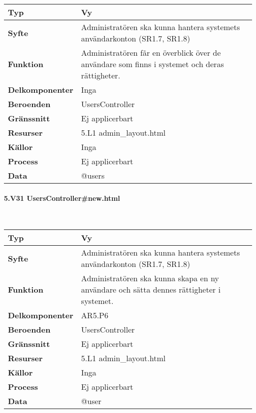 \documentclass[a4paper, twoside, 11pt, titlepage]{article}
\begin{document}
			\begin {table} [ht] \begin{tabular} {  p{3.5cm} p{11.6cm} }
				\hline
				{\sffamily\textbf{Typ}} & {Vy} \\
				\hline
				{\sffamily\textbf{Syfte}} & {Administratören ska kunna hantera systemets användarkonton (SR1.7, SR1.8)} \\
				\hline
				{\sffamily\textbf{Funktion}} & {Administratören får en överblick över de användare som finns i systemet och deras rättigheter.} \\
				\hline
				{\sffamily\textbf{Delkomponenter}} & {Inga} \\
				\hline
				{\sffamily\textbf{Beroenden}} & {UsersController} \\
				\hline
				{\sffamily\textbf{Gränssnitt}} & {Ej applicerbart} \\
				\hline
				{\sffamily\textbf{Resurser}} & {5.L1 admin\_layout.html} \\
				\hline
				{\sffamily\textbf{Källor}} & {Inga} \\
				\hline
				{\sffamily\textbf{Process}} & {Ej applicerbart} \\
				\hline
				{\sffamily\textbf{Data}} & {@users} \\
				\hline
			\end{tabular} \end{table} \FloatBarrier


			\paragraph{5.V31 UsersController\#new.html}\

			\begin {table} [ht] \begin{tabular} {  p{3.5cm} p{11.6cm} }
				\hline
				{\sffamily\textbf{Typ}} & {Vy} \\
				\hline
				{\sffamily\textbf{Syfte}} & {Administratören ska kunna hantera systemets användarkonton (SR1.7, SR1.8)} \\
				\hline
				{\sffamily\textbf{Funktion}} & {Administratören ska kunna skapa en ny användare och sätta dennes rättigheter i systemet.} \\
				\hline
				{\sffamily\textbf{Delkomponenter}} & {AR5.P6} \\
				\hline
				{\sffamily\textbf{Beroenden}} & {UsersController} \\
				\hline
				{\sffamily\textbf{Gränssnitt}} & {Ej applicerbart} \\
				\hline
				{\sffamily\textbf{Resurser}} & {5.L1 admin\_layout.html} \\
				\hline
				{\sffamily\textbf{Källor}} & {Inga} \\
				\hline
				{\sffamily\textbf{Process}} & {Ej applicerbart} \\
				\hline
				{\sffamily\textbf{Data}} & {@user} \\
				\hline
			\end{tabular} \end{table} \FloatBarrier
\end{document}
